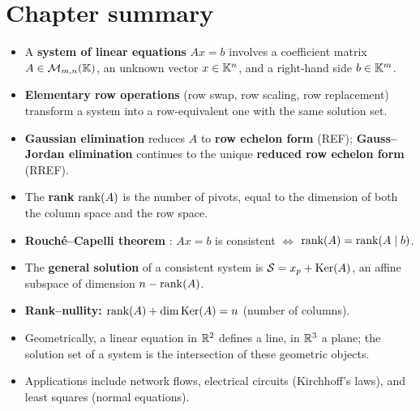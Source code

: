 \section{Chapter summary}\label{sec:summary-ch3}

\begin{itemize}
  \item A \textbf{system of linear equations}
    $Ax = b$ involves a coefficient matrix $A\in\mathcal{M}_{m,n}({\mathbb{K}})$, an
    unknown vector $x\in{\mathbb{K}}^n$, and a right-hand side $b\in{\mathbb{K}}^m$.

  \item \textbf{Elementary row operations}
    (row swap, row scaling, row replacement) transform a system into a
    row-equivalent one with the same solution set.

  \item \textbf{Gaussian elimination}
    reduces $A$ to \textbf{row echelon form}
    (REF); \textbf{Gauss--Jordan elimination}%
     continues to the unique
    \textbf{reduced row echelon form}
    (RREF).

  \item The \textbf{rank} $\operatorname{rank}(A)$ is the number of
    pivots, equal to the dimension of both the column space and the
    row space.

  \item \textbf{Rouch\'{e}--Capelli theorem}%
    :
    $Ax = b$ is consistent $\iff$ $\operatorname{rank}(A) = \operatorname{rank}(A\mid b)$.

  \item The \textbf{general solution} of a
    consistent system is
    ${\mathcal{S}} = x_p + \operatorname{Ker}(A)$,
    an affine subspace of dimension $n - \operatorname{rank}(A)$.

  \item \textbf{Rank--nullity:}
    $\operatorname{rank}(A) + \dim\operatorname{Ker}(A) = n$ (number of columns).

  \item Geometrically, a linear equation in ${\mathbb{R}}^2$ defines a line, in
    ${\mathbb{R}}^3$ a plane; the solution set of a system is the intersection
    of these geometric objects.

  \item Applications include network flows, electrical circuits
    (Kirchhoff's laws), and least squares (normal equations).
\end{itemize}
